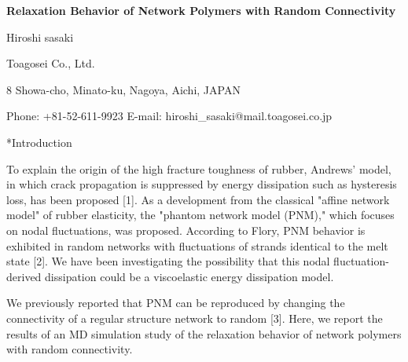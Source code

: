 \documentclass[uplatex,dvipdfmx,a4paper,12pt]{article}
\makeatletter
\def\section{\@startsection {section}{1}{\z@}{1.5 ex plus 2ex minus -.2ex}{0.5 ex plus .2ex}{\bf}}
\makeatother
\begin{document}
\begin{center}
\textbf{Relaxation Behavior of Network Polymers with Random Connectivity}

\vspace{\baselineskip}
Hiroshi sasaki

\vspace{0.5\baselineskip}
Toagosei Co., Ltd.

8 Showa-cho, Minato-ku, Nagoya, Aichi, JAPAN

Phone: +81-52-611-9923 E-mail: hiroshi\_sasaki@mail.toagosei.co.jp
\end{center}

\section*{Introduction}

To explain the origin of the high fracture toughness of rubber, Andrews' model, in which crack propagation is suppressed by energy dissipation such as hysteresis loss, has been proposed [1].
As a development from the classical "affine network model" of rubber elasticity, the "phantom network model (PNM)," which focuses on nodal fluctuations, was proposed.
According to Flory, PNM behavior is exhibited in random networks with fluctuations of strands identical to the melt state [2].
We have been investigating the possibility that this nodal fluctuation-derived dissipation could be a viscoelastic energy dissipation model.

We previously reported that PNM can be reproduced by changing the connectivity of a regular structure network to random [3].
Here, we report the results of an MD simulation study of the relaxation behavior of network polymers with random connectivity.
\end{document}
